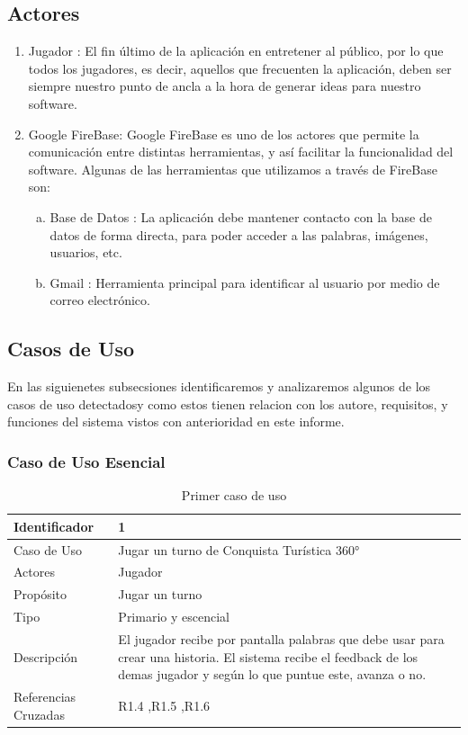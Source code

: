 \subsection{Actores}
\begin{enumerate}[1.]
	\item Jugador : El fin último de la aplicación en entretener al público, por lo que todos los jugadores, es decir, aquellos que frecuenten la aplicación, deben ser siempre nuestro punto de ancla a la hora de generar ideas para nuestro software.
	\item Google FireBase: Google FireBase es uno de los actores que permite la comunicación entre distintas herramientas, y así facilitar la funcionalidad del software. Algunas de las herramientas que utilizamos a través de FireBase son:
	\begin{enumerate}[a)]
		\item Base de Datos : La aplicación debe mantener contacto con la base de datos de forma directa, para poder acceder a las palabras, imágenes, usuarios, etc.
		\item Gmail : Herramienta principal para identificar al usuario por medio de correo electrónico.
	\end{enumerate} 
\end{enumerate}

\subsection{Casos de Uso}
En las siguienetes subsecsiones identificaremos y analizaremos algunos de los casos de uso detectadosy como estos tienen relacion con los autore, requisitos, y funciones del sistema vistos con anterioridad en este informe.
\subsubsection{Caso de Uso Esencial}
\begin{table}[H]
    \begin{center}
        \begin{tabular}{| l | m{12cm} |}        
        	\hline 
        	Identificador & 1\\
        	\hline
        	Caso de Uso & Jugar un turno de Conquista Turística
360°\\
        	\hline
        	Actores & Jugador\\
        	\hline
        	Propósito & Jugar un turno\\
        	\hline
        	Tipo & Primario y escencial\\
        	\hline
        	Descripción & El jugador recibe por pantalla palabras que debe usar para crear una historia. El sistema recibe el feedback de los demas jugador y según lo que puntue este, avanza o no.\\
        	\hline
        	Referencias Cruzadas & R1.4 ,R1.5 ,R1.6\\
        	\hline
        \end{tabular}
    \caption{Primer caso de uso}
    \label{Caso_de_uso_1}
    \end{center}
\end{table}

